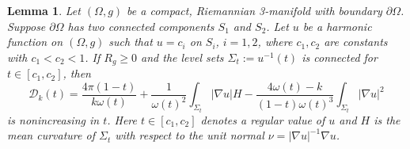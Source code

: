 \documentclass[12pt]{article}
\theoremstyle{definition}
\theoremstyle{plain}
\newtheorem{lemma}{Lemma}[section]
\numberwithin{equation}{section}
\begin{document}
\begin{lemma}\label{D mono}
Let $ (\Omega,g) $ be a compact, Riemannian 3-manifold with boundary $ \partial \Omega $. Suppose $ \partial \Omega $ has two connected components $ S_{1} $ and $ S_{2} $. Let $ u $ be a harmonic function on $ (\Omega,g) $ such that $ u=c_{i} $ on $ S_{i} $, $ i=1,2 $, where $ c_{1}, c_{2} $ are constants with $ c_{1}<c_{2}<1 $. If $ R_{g}\geq 0 $ and the level sets $ \Sigma_{t}:=u^{-1}(t) $ is connected for $ t\in [c_{1},c_{2}] $, then
\begin{equation}\label{D t}
\mathcal{D}_{k}(t)=\frac{4\pi(1-t)}{k\omega(t)}+\frac{1}{\omega(t)^{2}}\int_{\Sigma_{t}}|\nabla u|H-\frac{4\omega(t)-k}{(1-t)\omega(t)^{3}}\int_{\Sigma_{t}}|\nabla u|^{2}
\end{equation}
is nonincreasing in $ t $. Here $ t\in [c_{1},c_{2}] $ denotes a regular value of $ u $ and $ H $ is the mean curvature of $ \Sigma_{t} $ with respect to the unit normal $ \nu=|\nabla u|^{-1}\nabla u $.
\end{lemma}
\end{document}
